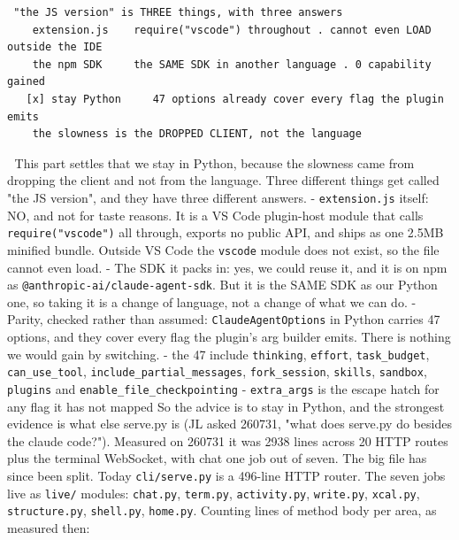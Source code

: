 \begin{verbatim}
 "the JS version" is THREE things, with three answers
    extension.js    require("vscode") throughout . cannot even LOAD outside the IDE
    the npm SDK     the SAME SDK in another language . 0 capability gained
   [x] stay Python     47 options already cover every flag the plugin emits
    the slowness is the DROPPED CLIENT, not the language
\end{verbatim}
📌 This part settles that we stay in Python, because the slowness came from dropping the client and not from the language. Three different things get called "the JS version", and they have three different answers. - \texttt{extension.js} itself: NO, and not for taste reasons. It is a VS Code plugin-host module that calls \texttt{require("vscode")} all through, exports no public API, and ships as one 2.5MB minified bundle. Outside VS Code the \texttt{vscode} module does not exist, so the file cannot even load. - The SDK it packs in: yes, we could reuse it, and it is on npm as \texttt{@anthropic-ai/claude-agent-sdk}. But it is the SAME SDK as our Python one, so taking it is a change of language, not a change of what we can do. - Parity, checked rather than assumed: \texttt{ClaudeAgentOptions} in Python carries 47 options, and they cover every flag the plugin's arg builder emits. There is nothing we would gain by switching. - the 47 include \texttt{thinking}, \texttt{effort}, \texttt{task\_budget}, \texttt{can\_use\_tool}, \texttt{include\_partial\_messages}, \texttt{fork\_session}, \texttt{skills}, \texttt{sandbox}, \texttt{plugins} and \texttt{enable\_file\_checkpointing} - \texttt{extra\_args} is the escape hatch for any flag it has not mapped So the advice is to stay in Python, and the strongest evidence is what else serve.py is (JL asked 260731, "what does serve.py do besides the claude code?"). Measured on 260731 it was 2938 lines across 20 HTTP routes plus the terminal WebSocket, with chat one job out of seven. The big file has since been split. Today \texttt{cli/serve.py} is a 496-line HTTP router. The seven jobs live as \texttt{live/} modules: \texttt{chat.py}, \texttt{term.py}, \texttt{activity.py}, \texttt{write.py}, \texttt{xcal.py}, \texttt{structure.py}, \texttt{shell.py}, \texttt{home.py}. Counting lines of method body per area, as measured then:

